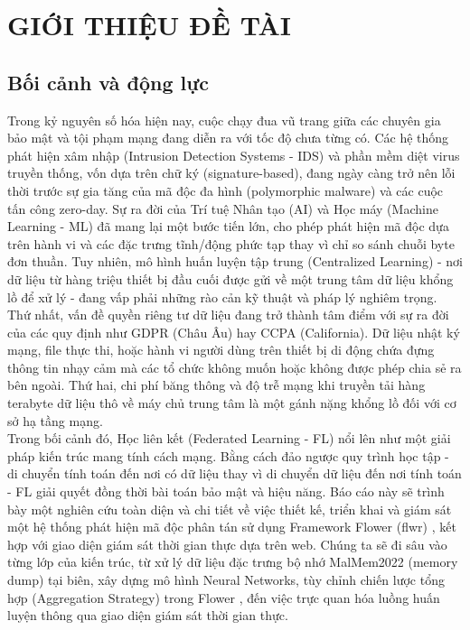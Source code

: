 \section{GIỚI THIỆU ĐỀ TÀI}

\subsection{Bối cảnh và động lực}
Trong kỷ nguyên số hóa hiện nay, cuộc chạy đua vũ trang giữa các chuyên gia bảo mật và tội phạm mạng đang diễn ra với tốc độ chưa từng có. Các hệ thống phát hiện xâm nhập (Intrusion Detection Systems - IDS) và phần mềm diệt virus truyền thống, vốn dựa trên chữ ký (signature-based), đang ngày càng trở nên lỗi thời trước sự gia tăng của mã độc đa hình (polymorphic malware) và các cuộc tấn công zero-day. Sự ra đời của Trí tuệ Nhân tạo (AI) và Học máy (Machine Learning - ML) đã mang lại một bước tiến lớn, cho phép phát hiện mã độc dựa trên hành vi và các đặc trưng tĩnh/động phức tạp thay vì chỉ so sánh chuỗi byte đơn thuần. Tuy nhiên, mô hình huấn luyện tập trung (Centralized Learning) - nơi dữ liệu từ hàng triệu thiết bị đầu cuối được gửi về một trung tâm dữ liệu khổng lồ để xử lý - đang vấp phải những rào cản kỹ thuật và pháp lý nghiêm trọng. \\

Thứ nhất, vấn đề quyền riêng tư dữ liệu đang trở thành tâm điểm với sự ra đời của các quy định như GDPR (Châu Âu) hay CCPA (California). Dữ liệu nhật ký mạng, file thực thi, hoặc hành vi người dùng trên thiết bị di động chứa đựng thông tin nhạy cảm mà các tổ chức không muốn hoặc không được phép chia sẻ ra bên ngoài. Thứ hai, chi phí băng thông và độ trễ mạng khi truyền tải hàng terabyte dữ liệu thô về máy chủ trung tâm là một gánh nặng khổng lồ đối với cơ sở hạ tầng mạng.\\

Trong bối cảnh đó, Học liên kết (Federated Learning - FL) nổi lên như một giải pháp kiến trúc mang tính cách mạng. Bằng cách đảo ngược quy trình học tập - di chuyển tính toán đến nơi có dữ liệu thay vì di chuyển dữ liệu đến nơi tính toán - FL giải quyết đồng thời bài toán bảo mật và hiệu năng. Báo cáo này sẽ trình bày một nghiên cứu toàn diện và chi tiết về việc thiết kế, triển khai và giám sát một hệ thống phát hiện mã độc phân tán sử dụng Framework Flower (flwr) \cite{beutel2022flowerfriendlyfederatedlearning}, kết hợp với giao diện giám sát thời gian thực dựa trên web. Chúng ta sẽ đi sâu vào từng lớp của kiến trúc, từ xử lý dữ liệu đặc trưng bộ nhớ MalMem2022 (memory dump) tại biên, xây dựng mô hình Neural Networks, tùy chỉnh chiến lược tổng hợp (Aggregation Strategy) trong Flower \cite{beutel2022flowerfriendlyfederatedlearning}, đến việc trực quan hóa luồng huấn luyện thông qua giao diện giám sát thời gian thực. \\

